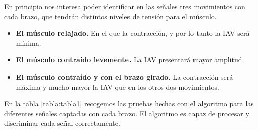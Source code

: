 En principio nos interesa poder identificar en las señales tres movimientos con cada brazo, que tendrán distintos niveles de tensión para el músculo.

	\begin{itemize}
	\item \textbf{El músculo relajado.} En el que la contracción, y por lo tanto la IAV será mínima.
	\item \textbf{El músculo contraído levemente.} La IAV presentará mayor amplitud.
	\item \textbf{El músculo contraído y con el brazo girado.} La contracción será máxima y mucho mayor la IAV que en los otros dos movimientos.
	\end{itemize}

En la tabla \ref{tabla:tabla1} recogemos las pruebas hechas con el algoritmo para las diferentes señales captadas con cada brazo. El algoritmo es capaz de procesar y discriminar cada señal correctamente. 

